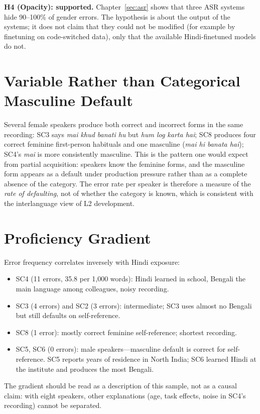 \documentclass[11pt,a4paper]{report}
\begin{document}
\textbf{H4 (Opacity): supported.} Chapter~\ref{sec:asr} shows that three ASR systems hide 90--100\% of gender errors. The hypothesis is about the output of the systems; it does not claim that they could not be modified (for example by finetuning on code-switched data), only that the available Hindi-finetuned models do not.

\section{Variable Rather than Categorical Masculine Default}

Several female speakers produce both correct and incorrect forms in the same recording: SC3 says \textit{mai khud banati hu} but \textit{hum log karta hai}; SC8 produces four correct feminine first-person habituals and one masculine (\textit{mai hi banata hai}); SC4's \textit{mai} is more consistently masculine. This is the pattern one would expect from partial acquisition: speakers know the feminine forms, and the masculine form appears as a default under production pressure rather than as a complete absence of the category. The error rate per speaker is therefore a measure of the \emph{rate of defaulting}, not of whether the category is known, which is consistent with the interlanguage view of L2 development.

\section{Proficiency Gradient}

Error frequency correlates inversely with Hindi exposure:
\begin{itemize}
  \item SC4 (11 errors, 35.8 per 1,000 words): Hindi learned in school, Bengali the main language among colleagues, noisy recording.
  \item SC3 (4 errors) and SC2 (3 errors): intermediate; SC3 uses almost no Bengali but still defaults on self-reference.
  \item SC8 (1 error): mostly correct feminine self-reference; shortest recording.
  \item SC5, SC6 (0 errors): male speakers---masculine default is correct for self-reference. SC5 reports years of residence in North India; SC6 learned Hindi at the institute and produces the most Bengali.
\end{itemize}
The gradient should be read as a description of this sample, not as a causal claim: with eight speakers, other explanations (age, task effects, noise in SC4's recording) cannot be separated.
\end{document}
